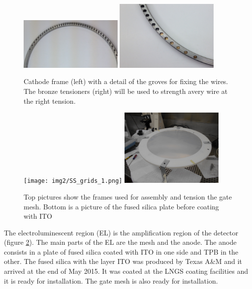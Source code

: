 \begin{figure}[hpt!]
\centering
\includegraphics[width=0.45\textwidth]{img2/cathode_1.png}
\includegraphics[width=0.45\textwidth]{img2/cathode_tensioners.png}
\caption{Cathode frame (left) with a detail of the groves for fixing the wires. The bronze tensioners (right) will be used to strength avery wire at the right tension.} \label{fig:cath}
\end{figure}

\begin{figure}[hpt!]
\centering
\texttt{[image: img2/SS\_grids\_1.png]}
\includegraphics[width=0.45\textwidth]{img2/Anode_coated.png}
\caption{Top pictures show the  frames used for assembly and tension the gate mesh. Bottom is a picture of the fused silica plate before coating with ITO} \label{fig:el}
\end{figure}

The electroluminescent region (EL) is the amplification region of the detector (figure \ref{fig:el}).  The main parts of the EL are the mesh and the anode. The anode consists in a plate of fused silica coated with ITO in one side and TPB in the other. The fused silica with the layer ITO was produced by Texas A\&M and it arrived at the end of May 2015. It was coated at the LNGS coating facilities and it is ready for installation. The gate mesh is also ready for installation.




